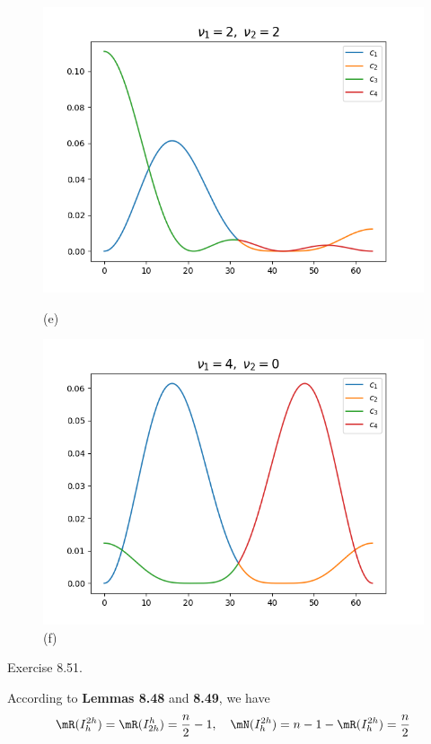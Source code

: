 \documentclass{homework}
\begin{document}
\begin{figure}[bhpt]
	\begin{minipage}[b]{0.5 \textwidth}
	\includegraphics[width=\textwidth]{Ex8_47_22.png}
	\caption{(e)}
	\end{minipage}
	\hspace{-0.2in}
	\begin{minipage}[b]{0.5 \textwidth}
	\includegraphics[width=\textwidth]{Ex8_47_40.png}
	\caption{(f)}
	\end{minipage}
	\end{figure}
	\clearpage
	
	
	
\question Exercise 8.51.

	According to \textbf{Lemmas 8.48} and \textbf{8.49}, we have
	\begin{eqnarray}
		\begin{aligned}
			\mR(I_h^{2h}) = \mR(I_{2h}^h) = \frac{n}{2} - 1,\quad 
			\mN(I_h^{2h}) = n - 1-\mR(I_h^{2h}) = \frac{n}{2}
		\end{aligned}
	\end{eqnarray}
\end{document}
